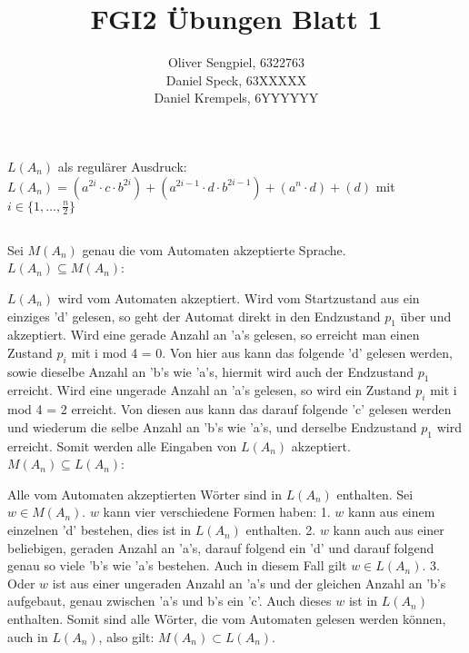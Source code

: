 \documentclass{article}
\title{FGI2 Übungen Blatt 1}
\author{Oliver Sengpiel, 6322763 \\ Daniel Speck, 63XXXXX \\ Daniel
Krempels, 6YYYYYY}
\begin{document}
\maketitle
\setcounter{section}{2}
\section{}
\subsection{} 
$L(A_n)$ als regulärer Ausdruck: \\
$L(A_n) = (a^{2i}\cdot c\cdot b^{2i}) + (a^{2i-1}\cdot d\cdot
b^{2i-1}) + (a^{n}\cdot d) + (d)$ mit $i \in \{1, \dots, \frac{n}{2}
\}$

\subsection{}
Sei $M(A_n)$ genau die vom Automaten akzeptierte Sprache. \\ $L(A_n)
\subseteq M(A_n)$: 

$L(A_n)$ wird vom Automaten akzeptiert. Wird vom Startzustand aus
ein einziges 'd' gelesen, so geht der Automat direkt in den
Endzustand $p_1$ über und akzeptiert. Wird eine gerade Anzahl an
'a's gelesen, so erreicht man einen Zustand $p_i$ mit i mod 4 = 0.
Von hier aus kann das folgende 'd' gelesen werden, sowie dieselbe
Anzahl an 'b's wie 'a's, hiermit wird auch der Endzustand $p_1$
erreicht. Wird eine ungerade Anzahl an 'a's gelesen, so wird ein
Zustand $p_i$ mit i mod 4 = 2 erreicht. Von diesen aus kann das
darauf folgende 'c' gelesen werden und wiederum die selbe Anzahl an
'b's wie 'a's, und derselbe Endzustand $p_1$ wird erreicht. Somit
werden alle Eingaben von $L(A_n)$ akzeptiert. \\ $M(A_n) \subseteq
L(A_n)$: 

Alle vom Automaten akzeptierten Wörter sind in $L(A_n)$ enthalten.
Sei $w \in M(A_n)$. $w$ kann vier verschiedene Formen haben: 1. $w$
kann aus einem einzelnen 'd' bestehen, dies ist in $L(A_n)$
enthalten. 2. $w$ kann auch aus einer beliebigen, geraden Anzahl an
'a's, darauf folgend ein 'd' und darauf folgend genau so viele 'b's
wie 'a's bestehen. Auch in diesem Fall gilt $w \in L(A_n)$. 3. Oder
$w$ ist aus einer ungeraden Anzahl an 'a's und der gleichen Anzahl
an 'b's aufgebaut, genau zwischen 'a's und b's ein 'c'. Auch dieses
$w$ ist in $L(A_n)$ enthalten. Somit sind alle Wörter, die vom
Automaten gelesen werden können, auch in $L(A_n)$, also gilt:
$M(A_n) \subset L(A_n)$. 
\end{document}
